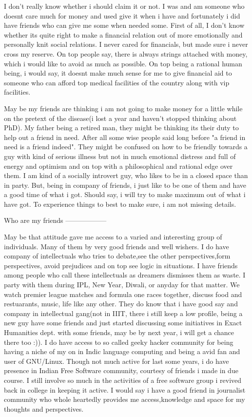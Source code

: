 I don't really know whether i should claim it or not. I was and am someone who doesnt care much for money and used give it when i have and fortunately i did have friends who can give me some when needed some. First of all, I don't know whether its quite right to make a financial relation out of more emotionally and personally knit social relations. I never cared for financials, but made sure i never cross my reserve. On top people say, there is always strings attached with money, which i would like to avoid as much as possible. On top being a rational human being, i would say, it doesnt make much sense for me to give financial aid to someone who can afford top medical facilities of the country along with vip facilities. 

May be my friends are thinking i am not going to make money for a little while on the pretext of the disease(i lost a year and haven't stopped thinking about PhD). My father being a retired man, they might be thinking its their duty to help out a friend in need. After all some wise people said long before "a friend in need is a friend indeed". They might be confused on how to be friendly towards a guy with kind of serious illness but not in much emotional distress and full of energy and optimism and on top with a philosophical and rational edge over them. I am kind of a socially introvert guy, who likes to be in a closed space than in party. But, being in company of friends, i just like to be one of them and have a good time of what i got. Should say, i will try to make maximum out of what i have got. To experience things to best to make sure, i am not missing details. 

Who are my friends
------------------

May be that attitude gave me access to a varied and interesting group of individuals. Many of them by very good friends and well wishers. I do have company of intellectuals who tries to debate,see the other perspectives,form perspectives, avoid prejudices and on top see logic in situations. I have friends among people who call these intellectuals as dreamers dismisses them as waste. I party with them during IPL, New Year, Diwali, or anyday for that matter. We watch premier league matches and formula one races together, discuss food and restuarants, music, life like any other. They do know that i have good say and company in intellectual gang(not in IIIT, there i still keep a low profile, being a new guy have some friends and just started discussing some initiatives in Exact Humanities dept. with some friends, may be by next year, i will get a chance there too :)). I do have access to so called geeky hacker community for being having a niche of my on in Indic language computing and being a avid fan and user of GNU/Linux. Though not much active for last some years, i do have presence in Indian Free Software community, courtesy of friends i made in due course. I still involve so much in the activities of a free software group i revived back in college in keeping it active. I would say i have a good friend in journalist community who whole heartedly provides me access,knowledge and space for my thoughts and perspectives.  


